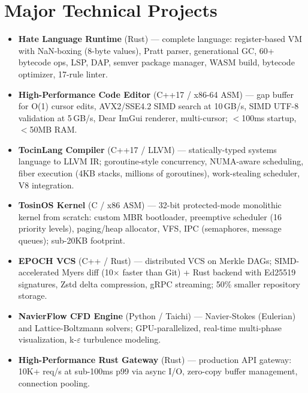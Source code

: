 \documentclass[10pt,a4paper]{article}
\newcommand{\project}[2]{\item {\bfseries #1} {\color{muted}\small(#2)}}
\begin{document}
\section{Major Technical Projects}
\begin{itemize}
  \project{Hate Language Runtime}{Rust} --- complete language: register-based VM with NaN-boxing (8-byte values),
        Pratt parser, generational GC, 60+ bytecode ops, LSP, DAP, semver package manager, WASM build,
        bytecode optimizer, 17-rule linter.
  \project{High-Performance Code Editor}{C++17 / x86-64 ASM} --- gap buffer for O(1) cursor edits, AVX2/SSE4.2
        SIMD search at 10\,GB/s, SIMD UTF-8 validation at 5\,GB/s, Dear ImGui renderer, multi-cursor;
        $<$100ms startup, $<$50MB RAM.
  \project{TocinLang Compiler}{C++17 / LLVM} --- statically-typed systems language to LLVM IR; goroutine-style
        concurrency, NUMA-aware scheduling, fiber execution (4KB stacks, millions of goroutines),
        work-stealing scheduler, V8 integration.
  \project{TosinOS Kernel}{C / x86 ASM} --- 32-bit protected-mode monolithic kernel from scratch: custom MBR
        bootloader, preemptive scheduler (16 priority levels), paging/heap allocator, VFS, IPC
        (semaphores, message queues); sub-20KB footprint.
  \project{EPOCH VCS}{C++ / Rust} --- distributed VCS on Merkle DAGs; SIMD-accelerated Myers diff (10$\times$
        faster than Git) + Rust backend with Ed25519 signatures, Zstd delta compression, gRPC streaming;
        50\% smaller repository storage.
  \project{NavierFlow CFD Engine}{Python / Taichi} --- Navier-Stokes (Eulerian) and Lattice-Boltzmann solvers;
        GPU-parallelized, real-time multi-phase visualization, k-$\varepsilon$ turbulence modeling.
  \project{High-Performance Rust Gateway}{Rust} --- production API gateway: 10K+ req/s at sub-100ms p99 via
        async I/O, zero-copy buffer management, connection pooling.
\end{itemize}

\end{document}
